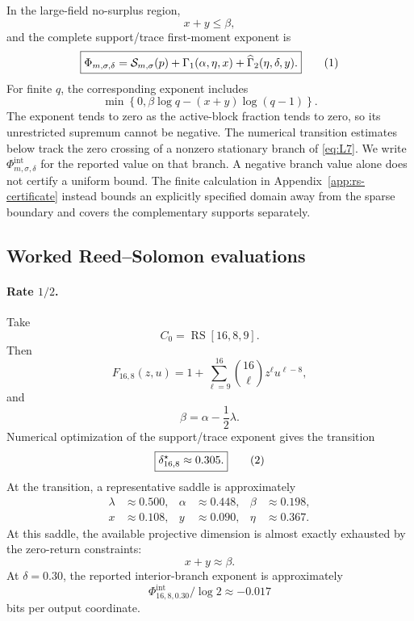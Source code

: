 In the large-field no-surplus region,
\[
    x+y\le\beta,
\]
and the complete support/trace first-moment exponent is
\[
    \boxed{
    \Phi_{m,\sigma,\delta}
      =
    \cS_{m,\sigma}(p)
      +
    \Gamma_1(\alpha,\eta,x)
      +
    \widehat\Gamma_2(\eta,\delta,y).
    }
    \eqnumlabel{eq:L7}
\]
For finite $q$, the corresponding exponent includes
\[
    \min\left\{
      0,
      \beta\log q-(x+y)\log(q-1)
    \right\}.
\]
The exponent tends to zero as the active-block fraction tends to zero, so
its unrestricted supremum cannot be negative.  The numerical transition
estimates below track the zero crossing of a nonzero stationary branch of
\eqref{eq:L7}.  We write $\Phi^{\mathrm{int}}_{m,\sigma,\delta}$ for the
reported value on that branch.  A negative branch value alone does not
certify a uniform bound.  The finite calculation in
Appendix~\ref{app:rs-certificate} instead bounds an explicitly specified
domain away from the sparse boundary and covers the complementary supports
separately.




\subsection{Worked Reed--Solomon evaluations}
\label{app:rs-evaluation}

\paragraph{Rate $1/2$.}

Take
\[
    C_0=\operatorname{RS}[16,8,9].
\]
Then
\[
    F_{16,8}(z,u)
      =
    1+
    \sum_{\ell=9}^{16}
    \binom{16}{\ell}z^\ell u^{\ell-8},
\]
and
\[
    \beta=\alpha-\frac12\lambda.
\]
Numerical optimization of the support/trace exponent gives the transition
\[
    \boxed{
    \delta^\star_{16,8}\approx0.305.
    }
    \eqnumlabel{eq:R1}
\]
At the transition, a representative saddle is approximately
\[
\begin{aligned}
    \lambda &\approx0.500, &
    \alpha &\approx0.448, &
    \beta &\approx0.198,\\
    x &\approx0.108, &
    y &\approx0.090, &
    \eta &\approx0.367.
\end{aligned}
\]
At this saddle, the available projective dimension is almost exactly exhausted
by the zero-return constraints:
\[
    \boxed{x+y\approx\beta.}
\]
At $\delta=0.30$, the reported interior-branch exponent is approximately
\[
    \Phi_{16,8,0.30}^{\mathrm{int}}/\log 2\approx-0.017
\]
bits per output coordinate.

